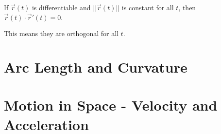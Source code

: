 \documentclass[../calc3.tex]{subfiles}
\begin{document}
\begin{theorem}
    If $\vec{r}(t)$ is differentiable and $||\vec{r}(t)||$ is constant for all $t$, then $\vec{r}(t)\cdot \vec{r}'(t)=0$.

    This means they are orthogonal for all $t$.
\end{theorem}



\section{Arc Length and Curvature}

\section{Motion in Space - Velocity and Acceleration}
\end{document}
